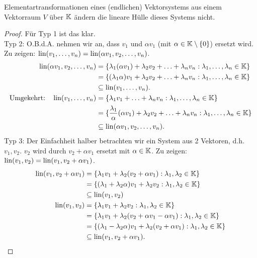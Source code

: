 \begin{lm}
	Elementartransformationen eines (endlichen) Vektorsystems aus einem Vektorraum $ V $ über $ \mathbb K $ ändern die lineare Hülle dieses Systems nicht.
\end{lm}
\begin{proof}
	Für Typ 1 ist das klar.\\[10pt]
	Typ 2: O.B.d.A. nehmen wir an, dass $ v_1 $ und $ \alpha v_1 $ (mit $ \alpha \in \mathbb K \setminus \{ 0 \} $) ersetzt wird. Zu zeigen: $ \operatorname{lin}(v_1, \ldots, v_n) = \operatorname{lin}(\alpha v_1, v_2, \ldots, v_n) $.
	\begin{align*}
		\operatorname{lin}(\alpha v_1, v_2, \ldots, v_n) &= \{ \lambda_1(\alpha v_1) + \lambda_2v_2 + \ldots + \lambda_nv_n : \lambda_1, \ldots, \lambda_n \in \mathbb K \}\\
		&= \{ (\lambda_1\alpha)v_1 + \lambda_2v_2 + \ldots + \lambda_nv_n : \lambda_1, \ldots, \lambda_n \in \mathbb K \}\\
		&\subseteq \operatorname{lin}(v_1, \ldots, v_n).\\
		\text{Umgekehrt:} \quad \operatorname{lin}(v_1, \ldots, v_n) &= \{ \lambda_1v_1 + \ldots + \lambda_nv_n : \lambda_1, \ldots, \lambda_n \in \mathbb K \}\\
		&= \{ \frac{\lambda_1}{\alpha}(\alpha v_1) + \lambda_2v_2 + \ldots + \lambda_nv_n : \lambda_1, \ldots, \lambda_n \in \mathbb K \}\\
		&\subseteq \operatorname{lin}(\alpha v_1, v_2, \ldots, v_n).
	\end{align*}
	Typ 3: Der Einfachheit halber betrachten wir ein System aus 2 Vektoren, d.h. $ v_1, v_2 $. $ v_2 $ wird durch $ v_2 + \alpha v_1 $ ersetzt mit $ \alpha \in \mathbb K $. Zu zeigen: $ \operatorname{lin}(v_1,v_2) = \operatorname{lin}(v_1,v_2 + \alpha v_1) $.
	\begin{align*}
		\operatorname{lin}(v_1, v_2 + \alpha v_1) &= \{ \lambda_1v_1 + \lambda_2(v_2 + \alpha v_1) : \lambda_1, \lambda_2 \in \mathbb K \}\\
		&= \{ (\lambda_1 + \lambda_2\alpha)v_1 + \lambda_2v_2 : \lambda_1, \lambda_2 \in \mathbb K \}\\
		&\subseteq \operatorname{lin}(v_1, v_2)\\
		\operatorname{lin}(v_1, v_2) &= \{ \lambda_1v_1 + \lambda_2v_2 : \lambda_1, \lambda_2 \in \mathbb K \}\\
		&= \{ \lambda_1v_1 + \lambda_2(v_2 + \alpha v_1 - \alpha v_1) : \lambda_1, \lambda_2 \in \mathbb K \}\\
		&= \{ (\lambda_1 - \lambda_2\alpha)v_1 + \lambda_2(v_2 + \alpha v_1) : \lambda_1, \lambda_2 \in \mathbb K \}\\
		&\subseteq \operatorname{lin}(v_1, v_2 + \alpha v_1). \qedhere
	\end{align*}
\end{proof}

